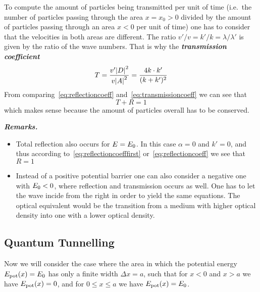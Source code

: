 \documentclass[../../script.tex]{subfiles}
\begin{document}
To compute the amount of particles being transmitted per unit of time (i.e.\ the number of particles passing through the area $x = x_0 > 0$ divided by the amount of particles passing through an area $x < 0$ per unit of time)
one has to consider that the velocities in both areas are different.
The ratio $v' / v = k' / k = \lambda / \lambda'$ is given by the ratio of the wave numbers. That is why the \textbf{\textit{transmission coefficient}}
\begin{equation}\label{eq:transmissioncoeff}
	T = \frac{v' \abs{D}^2}{v \abs{A}^2} = \frac{4k \cdot k'}{(k + k')^2}
\end{equation}
From comparing~\eqref{eq:reflectioncoeff} and~\eqref{eq:transmissioncoeff} we can see that 
\[
	T + R = 1	
\]
which makes sense because the amount of particles overall has to be conserved.

\textbf{\textit{Remarks.}}
\begin{itemize}
	\item Total reflection also occurs for $E = E_{\text{0}}$. In this case $\alpha = 0$ and $k' = 0$, and thus according to~\eqref{eq:reflectioncoefffirst} or~\eqref{eq:reflectioncoeff} we see that $R = 1$
	\item Instead of a positive potential barrier one can also consider a negative one with $E_{\text{0}} < 0$, where reflection and transmission occurs as well. 
	One has to let the wave incide from the right in order to yield the same equations. The optical equivalent would be the transition from a medium with higher optical density into one with a lower optical density.
\end{itemize}

\subsection{Quantum Tunnelling}
Now we will consider the case where the area in which the potential energy $E_{\text{pot}}(x) = E_{\text{0}}$ has only a finite width $\Delta x = a$,
such that for $x < 0$ and $x > a$ we have $E_{\text{pot}}(x) = 0$, and for $0 \le x \le a$ we have $E_{\text{pot}}(x) = E_{\text{0}}$.
\end{document}
